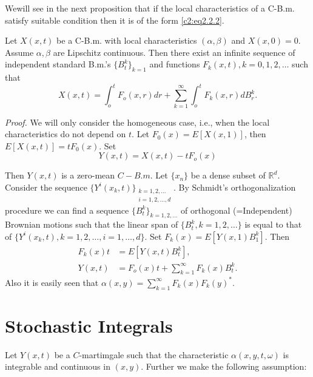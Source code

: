  We\pageoriginale will see in the next proposition that if the local characteristics
 of a C-B.m. satisfy suitable condition then it is of the form
 \eqref{c2:eq2.2.2}. 
 
\setcounter{proposition}{7}
\begin{proposition}\label{c2:prop2.2.8}%
  Let $X(x, t)$ be a C-B.m. with local characteristics $(\alpha,
  \beta)$ and $X(x, 0)=0$. Assume $\alpha, \beta$ are Lipschitz
  continuous. Then there exist an infinite sequence of independent
  standard B.m.'s $\{B^k_t\}_{k=1}$ and functions $F_k(x,t),k=0,1,2,
  \ldots $ such that 
  $$
  X(x,t)=\int^t_o F_o(x,r)dr+\sum ^{\infty}_{k=1}\int^t_o F_k(x,r)dB^k_r.
  $$
\end{proposition}

\noindent \textit{Proof.}
  We will only consider the homogeneous case, i.e.,  when the local
  characteristics do not depend on $t$. Let $F_0(x)=E[X(x, 1)]$, then
  $E[X(x, t)]=t F_0(x)$. Set 
  \begin{equation*}
  Y(x,t) = X(x,t)-t F_o(x)\tag*{$\Box$}
  \end{equation*}

 Then $Y(x, t)$ is a zero-mean $C-B.m$. Let $\{x_n\}$ be a dense
 subset of $\mathbb{R}^d$. Consider the sequence
 ${\{Y^i(x_k,t)\}}_{\substack{k=1,2,\ldots\\ i=1,2,\ldots, d}}$. By
 Schmidt's orthogonalization procedure we can find a sequence
 $\{B^k_t\}_{k=1,2, \ldots}$ of orthogonal (=Independent) Brownian
 motions such that the linear span of $\{B^k_t, k=1,2,\ldots\}$ is
 equal to that of $\{Y^i (x_k,t),k=1,2,\ldots,i=1, \ldots,d\}$. Set
 $F_k(x)=E[Y(x,1)B^k_1]$. 
 \noindent  Then 
 \begin{align*}
   F_k(x)t & =E[Y(x,t)B^k_t],\\
   Y(x,t)& =F_o(x)t+ \sum^{\infty}_{k=1}F_k(x)B^k_t.
 \end{align*} 
 Also it is easily seen that $\alpha(x,y)= \sum
 \limits^{\infty}_{k=1}F_k(x)F_k(y)^*$. 

 \section{Stochastic Integrals}\label{chap2:sec2.3}\pageoriginale%
 
 Let $Y(x, t)$ be a $C$-martimgale such that the characteristic
 $\alpha (x, y, t, \omega) $ is integrable and continuous in 
$(x, y)$. Further we make the following assumption:  


